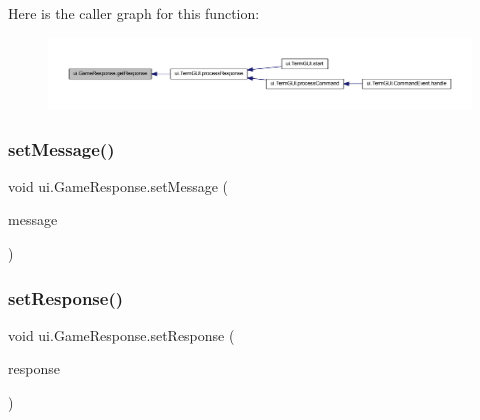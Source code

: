 Here is the caller graph for this function\+:
\nopagebreak
\begin{figure}[H]
\begin{center}
\leavevmode
\includegraphics[width=350pt]{classui_1_1_game_response_a07e8690d7e6c9b49792c099896bdd617_icgraph}
\end{center}
\end{figure}
\mbox{\label{classui_1_1_game_response_a963c44a059ac5377140697f0c7ffdb87}} 
\subsubsection{\texorpdfstring{set\+Message()}{setMessage()}}
{\footnotesize\ttfamily void ui.\+Game\+Response.\+set\+Message (\begin{DoxyParamCaption}\item[{String}]{message }\end{DoxyParamCaption})\hspace{0.3cm}{\ttfamily [inline]}}

\mbox{\label{classui_1_1_game_response_a0a441c0cd23e925cf68bd34e0917e9dc}} 
\subsubsection{\texorpdfstring{set\+Response()}{setResponse()}}
{\footnotesize\ttfamily void ui.\+Game\+Response.\+set\+Response (\begin{DoxyParamCaption}\item[{\mbox{\hyperlink{enumui_1_1commands_1_1_game_to_user_call}{Game\+To\+User\+Call}}}]{response }\end{DoxyParamCaption})\hspace{0.3cm}{\ttfamily [inline]}}



